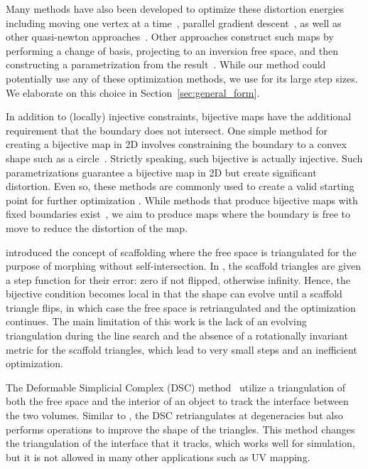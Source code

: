 Many methods have also been developed to optimize these distortion energies including moving one vertex at a time~\cite{hormann2000mips}, parallel gradient descent~\cite{fu2015computing}, as well as other quasi-newton approaches~\cite{Smith:2015,Kovalsky:2016,rabinovich2017scalable}. Other approaches construct such maps by performing a change of basis, projecting to an inversion free space, and then constructing a parametrization from the result~\cite{Fu:2016}. While our method could potentially use any of these optimization methods, we use \cite{rabinovich2017scalable} for its large step sizes. We elaborate on this choice in Section~\ref{sec:general_form}.

In addition to (locally) injective constraints, bijective maps have the additional requirement that the boundary does not intersect.  One simple method for creating a bijective map in 2D involves constraining the boundary to a convex shape such as a circle~\cite{Tutte:1963,Floater:97}. Strictly speaking, such bijective is actually injective.  
Such parametrizations guarantee a bijective map in 2D but create significant distortion.  Even so, these methods are commonly used to create a valid starting point for further optimization \cite{Schuller:2013,Smith:2015,rabinovich2017scalable}. 
While methods that produce bijective maps with fixed boundaries exist~\cite{Weber:2014:LIP,Campen:2016}, we aim to produce maps where the boundary is free to move to reduce the distortion of the map.

\cite{Gotsman:2001, surazhsky2001morphing} introduced the concept of scaffolding where the free space is triangulated for the purpose of morphing without self-intersection. In \cite{Zhang:2005}, the scaffold triangles are given a step function for their error: zero if not flipped, otherwise infinity. Hence, the bijective condition becomes local in that the shape can evolve until a scaffold triangle flips, in which case the free space is retriangulated and the optimization continues. The main limitation of this work is the lack of an evolving triangulation during the line search and the absence of a rotationally invariant metric for the scaffold triangles, which lead to very small steps and an inefficient optimization.

The Deformable Simplicial Complex (DSC) method~\cite{Misztal:2012} utilize a triangulation of both the free space and the interior of an object to track the interface between the two volumes.  Similar to \cite{Zhang:2005}, the DSC retriangulates at degeneracies but also performs operations to improve the shape of the triangles.  This method changes the triangulation of the interface that it tracks, which works well for simulation, but it is not allowed in many other applications such as UV mapping.

